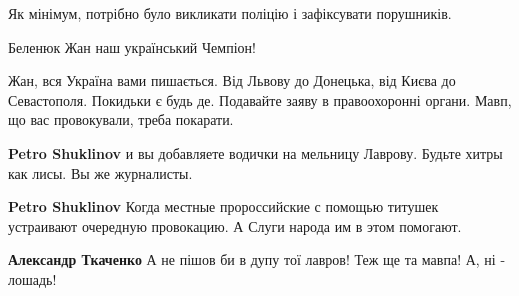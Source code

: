 \begin{itemize}

Як мінімум, потрібно було викликати поліцію і зафіксувати порушників.

 
Беленюк Жан наш український Чемпіон!


Жан, вся Україна вами пишається. Від Львову до Донецька, від Києва до
Севастополя. Покидьки є будь де. Подавайте заяву в правоохоронні органи. Мавп,
що вас провокували, треба покарати.

\begin{itemize}
 
\textbf{Petro Shuklinov} и вы добавляете водички на мельницу Лаврову. Будьте хитры как лисы. Вы же журналисты.

 
\textbf{Petro Shuklinov} Когда местные пророссийские с помощью титушек устраивают очередную провокацию. А Слуги народа им в этом помогают.

 
\textbf{Александр Ткаченко} А не пішов би в дупу тої лавров! Теж ще та мавпа! А, ні - лошадь!

 

\end{itemize}
\end{itemize}
